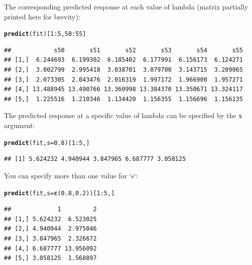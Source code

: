 \documentclass[12pt,letter]{article}\usepackage[]{graphicx}\usepackage[]{color}
\makeatletter
\newcommand{\hlnum}[1]{\textcolor[rgb]{0.686,0.059,0.569}{#1}}%
\newcommand{\hlopt}[1]{\textcolor[rgb]{0,0,0}{#1}}%
\newcommand{\hlstd}[1]{\textcolor[rgb]{0.345,0.345,0.345}{#1}}%
\newcommand{\hlkwc}[1]{\textcolor[rgb]{0.333,0.667,0.333}{#1}}%
\newcommand{\hlkwd}[1]{\textcolor[rgb]{0.737,0.353,0.396}{\textbf{#1}}}%
\newenvironment{kframe}{%
 \def\at@end@of@kframe{}%
 \ifinner\ifhmode%
  \def\at@end@of@kframe{\end{minipage}}%
  \begin{minipage}{\columnwidth}%
 \fi\fi%
 \def\FrameCommand##1{\hskip\@totalleftmargin \hskip-\fboxsep
 \colorbox{shadecolor}{##1}\hskip-\fboxsep
     \hskip-\linewidth \hskip-\@totalleftmargin \hskip\columnwidth}%
 \MakeFramed {\advance\hsize-\width
   \@totalleftmargin\z@ \linewidth\hsize
   \@setminipage}}%
 {\par\unskip\endMakeFramed%
 \at@end@of@kframe}
\newenvironment{knitrout}{}{} %
\makeatother
\begin{document}
The corresponding predicted response at each value of lambda (matrix partially printed here for brevity):

\begin{knitrout}\scriptsize
{}\color{fgcolor}\begin{kframe}
\begin{alltt}
\hlkwd{predict}\hlstd{(fit)[}\hlnum{1}\hlopt{:}\hlnum{5}\hlstd{,}\hlnum{50}\hlopt{:}\hlnum{55}\hlstd{]}
\end{alltt}
\begin{verbatim}
##            s50       s51       s52       s53       s54       s55
## [1,]  6.244693  6.199302  6.185402  6.177991  6.156173  6.124271
## [2,]  3.002799  2.995418  3.038701  3.079700  3.143715  3.209065
## [3,]  2.073305  2.043476  2.016319  1.997172  1.966900  1.957271
## [4,] 13.488945 13.490766 13.360998 13.384370 13.350671 13.324117
## [5,]  1.225516  1.210346  1.134420  1.156355  1.156696  1.156135
\end{verbatim}
\end{kframe}
\end{knitrout}


The predicted response at a specific value of lambda can be specified by the \texttt{s} argument:

\begin{knitrout}\scriptsize
{}\color{fgcolor}\begin{kframe}
\begin{alltt}
\hlkwd{predict}\hlstd{(fit,} \hlkwc{s} \hlstd{=} \hlnum{0.8}\hlstd{)[}\hlnum{1}\hlopt{:}\hlnum{5}\hlstd{, ]}
\end{alltt}
\begin{verbatim}
## [1] 5.624232 4.940944 3.847965 6.687777 3.058125
\end{verbatim}
\end{kframe}
\end{knitrout}


You can specify more than one value for `s`:

\begin{knitrout}\scriptsize
{}\color{fgcolor}\begin{kframe}
\begin{alltt}
\hlkwd{predict}\hlstd{(fit,} \hlkwc{s} \hlstd{=} \hlkwd{c}\hlstd{(}\hlnum{0.8}\hlstd{,} \hlnum{0.2}\hlstd{))[}\hlnum{1}\hlopt{:}\hlnum{5}\hlstd{, ]}
\end{alltt}
\begin{verbatim}
##             1         2
## [1,] 5.624232  6.523025
## [2,] 4.940944  2.975046
## [3,] 3.847965  2.326672
## [4,] 6.687777 13.956092
## [5,] 3.058125  1.568897
\end{verbatim}
\end{kframe}
\end{knitrout}
\end{document}
